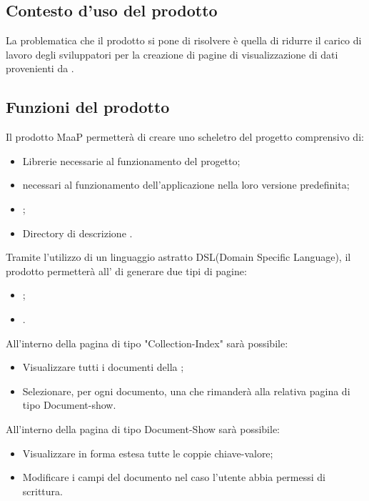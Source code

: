 \subsection{Contesto d'uso del prodotto} %
La problematica che il prodotto si pone di risolvere è quella di ridurre il carico di lavoro degli sviluppatori per la creazione di pagine  di visualizzazione di dati provenienti da .

\subsection{Funzioni del prodotto} %
Il prodotto MaaP permetterà di creare uno scheletro del progetto comprensivo di:
\begin{itemize}
\item Librerie necessarie al funzionamento del progetto;
\item {} necessari al funzionamento dell'applicazione nella loro versione predefinita;
\item {};
\item Directory di descrizione .
\end{itemize}
Tramite l'utilizzo di un linguaggio astratto DSL(Domain Specific Language), il prodotto permetterà all' di generare due tipi di pagine:
\begin{itemize}
\item {};
\item {}.
\end{itemize}

All'interno della pagina di tipo "Collection-Index" sarà possibile:
\begin{itemize}
\item Visualizzare tutti i documenti della ;
\item Selezionare, per ogni documento, una  che rimanderà alla relativa pagina di tipo Document-show.
\end{itemize}

All'interno della pagina di tipo Document-Show sarà possibile:
\begin{itemize}
\item Visualizzare in forma estesa tutte le coppie chiave-valore;
\item Modificare i campi del documento nel caso l'utente abbia permessi di scrittura.
\end{itemize}

